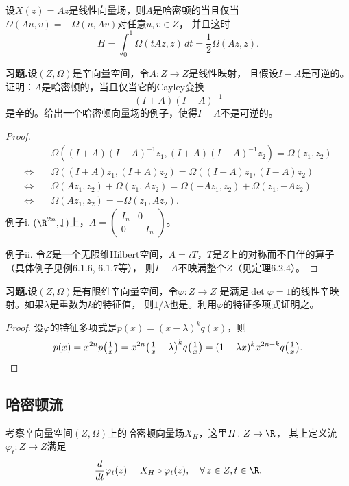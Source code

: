 \begin{corollary}
    设$X(z)=Az$是线性向量场，则$A$是哈密顿的当且仅当
    $\Omega(Au,v)=-\Omega(u,Av)$对任意$u,v\in Z$，
    并且这时
    $$H=\int_0^1\Omega(tAz,z)\,dt=\frac{1}{2}\Omega(Az,z).$$
\end{corollary}

\textbf{习题.}设$(Z,\Omega)$是辛向量空间，令$A\colon Z\to Z$是线性映射，
且假设$I-A$是可逆的。证明：$A$是哈密顿的，当且仅当它的Cayley变换
$$(I+A)(I-A)^{-1}$$
是辛的。给出一个哈密顿向量场的例子，使得$I-A$不是可逆的。
\begin{proof}
\begin{align*}
    &\Omega((I+A)(I-A)^{-1}z_1,(I+A)(I-A)^{-1}z_2)=\Omega(z_1,z_2)\\
    \Leftrightarrow\quad&\Omega((I+A)z_1,(I+A)z_2)=\Omega((I-A)z_1,(I-A)z_2)\\
    \Leftrightarrow\quad&\Omega(Az_1,z_2)+\Omega(z_1,Az_2)
    =\Omega(-Az_1,z_2)+\Omega(z_1,-Az_2)\\
    \Leftrightarrow\quad&\Omega(Az_1,z_2)=-\Omega(z_1,Az_2).
\end{align*}
例子i. $(\R^{2n},\j)$上，$A=\begin{pmatrix}I_n&0\\0&-I_n\end{pmatrix}$。

例子ii. 令$Z$是一个无限维Hilbert空间，$A=iT$，$T$是$Z$上的对称而不自伴的算子
（具体例子见\cite{ZG}例6.1.6, 6.1.7等），
则$I-A$不映满整个$Z$（见\cite{ZG}定理6.2.4）。
\end{proof}

\textbf{习题.}设$(Z,\Omega)$是有限维辛向量空间，令$\varphi\colon Z\to Z$
是满足$\det\varphi=1$的线性辛映射。如果$\lambda$是重数为$k$的特征值，
则$1/\lambda$也是。利用$\varphi$的特征多项式证明之。
\begin{proof}
    设$\varphi$的特征多项式是$p(x)=(x-\lambda)^kq(x)$，则
    $$p(x)=x^{2n}p\big(\tfrac{1}{x}\big)
    =x^{2n}\big(\tfrac{1}{x}-\lambda\big)^kq\big(\tfrac{1}{x}\big)
    =(1-\lambda x)^kx^{2n-k}q\big(\tfrac{1}{x}\big).\qedhere$$
\end{proof}

\subsection{哈密顿流}
考察辛向量空间$(Z,\Omega)$上的哈密顿向量场$X_H$，这里$H\colon Z\to\R$，
其上定义流$\varphi_t\colon Z\to Z$满足
$$\frac{d}{dt}\varphi_t(z)=X_H\circ\varphi_t(z),\quad\forall\,z\in Z,t\in\R.$$

